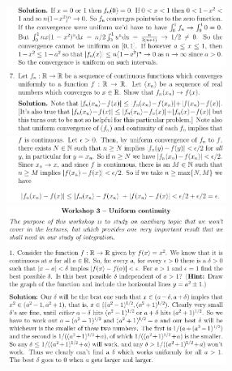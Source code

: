 \documentclass[8pt,landscape]{article}
\begin{document}
\begin{multicols}{3}
    \includegraphics[width=270]{014.png} \\
    \includegraphics[width=270]{015.png} \\
    \includegraphics[width=270]{016.png} \\
    \includegraphics[width=270]{017.png} \\
    \includegraphics[width=270]{018.png} \\
    \includegraphics[width=270]{019.png} \\

\end{multicols}
\end{document}
